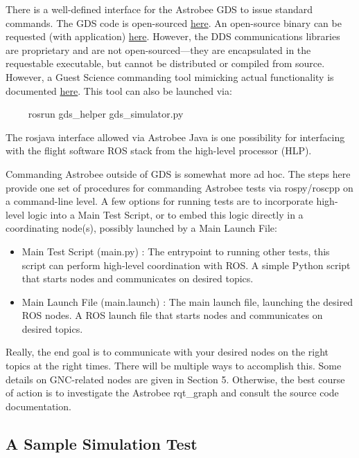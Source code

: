 \documentclass{article}
\begin{document}
There is a well-defined interface for the Astrobee GDS to issue standard commands. The GDS code is open-sourced \href{https://github.com/nasa/astrobee_gds/}{here}. An open-source binary can be requested (with application) \href{https://software.nasa.gov/software/ARC-17994-1}{here}. However, the DDS communications libraries are proprietary and are not open-sourced---they are encapsulated in the requestable executable, but cannot be distributed or compiled from source. However, a Guest Science commanding tool mimicking actual functionality is documented \href{https://github.com/nasa/astrobee_android/blob/master/running_gs_app.md#4-guest-science-commanding}{here}. This tool can also be launched via:

\begin{markdown}
~~~~
rosrun gds_helper gds_simulator.py
~~~~
\end{markdown}

The rosjava interface allowed via Astrobee Java is one possibility for interfacing with the flight software ROS stack from the high-level processor (HLP).

Commanding Astrobee outside of GDS is somewhat more ad hoc. The steps here provide one set of procedures for commanding Astrobee tests via rospy/roscpp on a command-line level. A few options for running tests are to incorporate high-level logic into a Main Test Script, or to embed this logic directly in a coordinating node(s), possibly launched by a Main Launch File:
\begin{itemize}
    \item Main Test Script (main.py) : The entrypoint to running other tests, this script can perform high-level coordination with ROS. A simple Python script that starts nodes and communicates on desired topics.
    \item Main Launch File (main.launch) : The main launch file, launching the desired ROS nodes. A ROS launch file that starts nodes and communicates on desired topics.
\end{itemize}

Really, the end goal is to communicate with your desired nodes on the right topics at the right times. There will be multiple ways to accomplish this. Some details on GNC-related nodes are given in Section 5. Otherwise, the best course of action is to investigate the Astrobee rqt\_graph and consult the source code documentation.

\subsection{A Sample Simulation Test}
\end{document}
